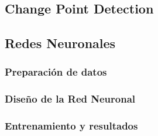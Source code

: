 \subsection{Change Point Detection}
\subsection{Redes Neuronales}
\subsubsection{Preparación de datos}
\subsubsection{Diseño de la Red Neuronal}
\subsubsection{Entrenamiento y resultados}
